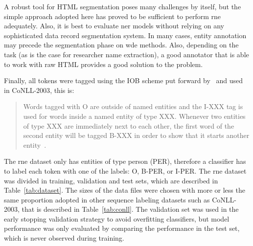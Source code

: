 \documentclass{nle}
\begin{document}

A robust tool for HTML segmentation poses many challenges by itself, but the simple approach 
adopted here has proved to be sufficient to perform \gls{rne} adequately. 
Also, it is best to evaluate \gls{ner} models without relying on any sophisticated data 
record segmentation system.
In many cases, entity annotation may precede the segmentation
phase on \gls{wde} methods. Also, depending on the task (as is the case
for researcher name extraction), a good annotator that is able to work 
with raw HTML provides a good solution to the problem.

Finally, all tokens were tagged using the IOB scheme put forward by~\cite{Ramshaw1999}
and used in {CoNLL-2003}, this is:

\begin{quote}
Words tagged with O are outside of named entities
and the I-XXX tag is used for words inside a
named entity of type XXX. Whenever two entities of
type XXX are immediately next to each other, the
first word of the second entity will be tagged B-XXX
in order to show that it starts another entity~\cite{KimSang2003}.
\end{quote}

The \gls{rne} dataset only has entities of type person (PER), therefore a classifier has to
label each token with one of the labels: O, B-PER, or I-PER. 
% 
% 
The \gls{rne} dataset was divided in training, validation and test sets, which are described in 
Table~\ref{tab:dataset}. The sizes of the data files were chosen with more or 
less the same proportion adopted in other sequence labeling datasets such
as {CoNLL-2003}, that is described in Table~\ref{tab:conll}. The validation set 
was used in the early stopping 
validation strategy to avoid overfitting classifiers, but model performance 
was only evaluated by comparing the performance in the test set, which is
never observed during training.
\end{document}
